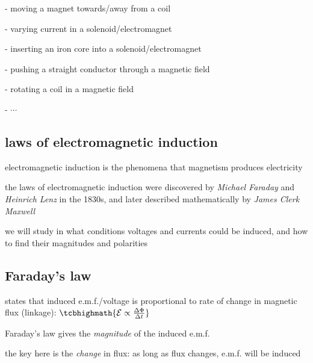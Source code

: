 \begin{compactenum}
	\item[-] moving a magnet towards/away from a coil
	
	\item[-] varying current in a solenoid/electromagnet
	
	\item[-] inserting an iron core into a solenoid/electromagnet
	
	\item[-] pushing a straight conductor through a magnetic field
	
	\item[-] rotating a coil in a magnetic field
	
	\item[-] $\cdots$
\end{compactenum}



\subsection{laws of electromagnetic induction}

electromagnetic induction is the phenomena that magnetism produces electricity

the laws of electromagnetic induction were discovered by \emph{Michael Faraday} and \emph{Heinrich Lenz} in the 1830s, and later described mathematically by \emph{James Clerk Maxwell}

we will study in what conditions voltages and currents could be induced, and how to find their magnitudes and polarities

\subsection{Faraday's law}

\rcyskip

\begin{ilight}
	 states that induced e.m.f./voltage is proportional to rate of change in magnetic flux (linkage): $\tcbhighmath{\mathcal{E} \propto \frac{\Delta \Phi}{\Delta t}}$
\end{ilight}

\cmt Faraday's law gives the \emph{magnitude} of the induced e.m.f.

the key here is the \emph{change} in flux: as long as flux changes, e.m.f. will be induced

